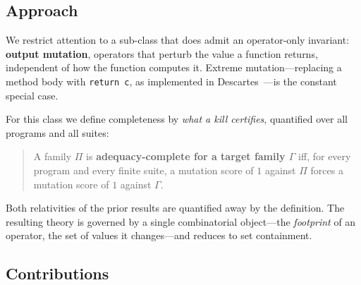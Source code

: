 \documentclass[runningheads,envcountsect,envcountsame]{llncs}
\begin{document}
\subsection{Approach}

We restrict attention to a sub-class that does admit an operator-only invariant:
\textbf{output mutation}, operators that perturb the value a function returns,
independent of how the function computes it. Extreme mutation---replacing a
method body with \texttt{return c}, as implemented in
Descartes~\cite{niedermayr2016,veraperez2018}---is the constant special case.

For this class we define completeness by \emph{what a kill certifies}, quantified
over all programs and all suites:

\begin{quote}
A family $\Pi$ is \textbf{adequacy-complete for a target family $\Gamma$} iff,
for every program and every finite suite, a mutation score of $1$ against $\Pi$
forces a mutation score of $1$ against $\Gamma$.
\end{quote}

Both relativities of the prior results are quantified away by the definition. The
resulting theory is governed by a single combinatorial object---the
\emph{footprint} of an operator, the set of values it changes---and reduces to
set containment.

\subsection{Contributions}
\end{document}
